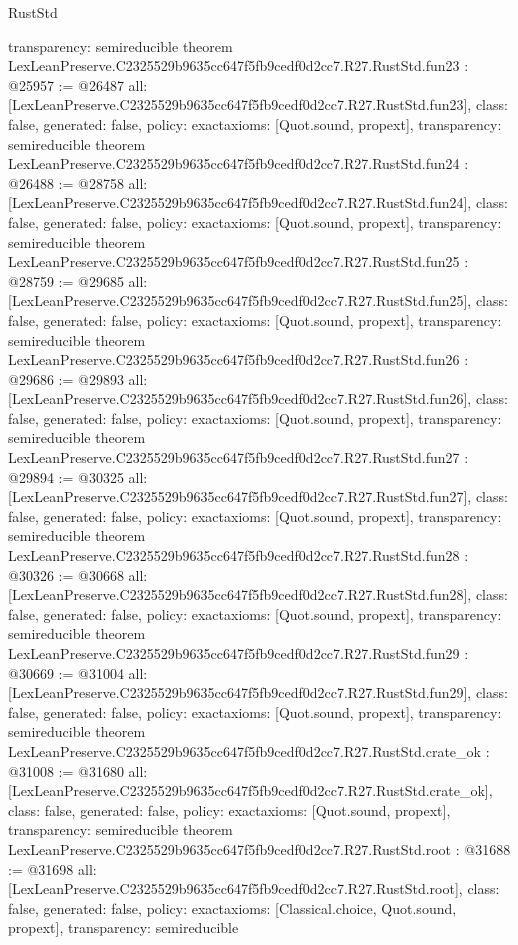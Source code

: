 \begin{lexlean}{RustStd}
\begin{coremodule}
{  transparency: semireducible
}
theorem LexLeanPreserve.C2325529b9635cc647f5fb9cedf0d2cc7.R27.RustStd.fun23 : @25957 := @26487 {
  all: [LexLeanPreserve.C2325529b9635cc647f5fb9cedf0d2cc7.R27.RustStd.fun23],
  class: false,
  generated: false,
  policy: exact{axioms: [Quot.sound, propext]},
  transparency: semireducible
}
theorem LexLeanPreserve.C2325529b9635cc647f5fb9cedf0d2cc7.R27.RustStd.fun24 : @26488 := @28758 {
  all: [LexLeanPreserve.C2325529b9635cc647f5fb9cedf0d2cc7.R27.RustStd.fun24],
  class: false,
  generated: false,
  policy: exact{axioms: [Quot.sound, propext]},
  transparency: semireducible
}
theorem LexLeanPreserve.C2325529b9635cc647f5fb9cedf0d2cc7.R27.RustStd.fun25 : @28759 := @29685 {
  all: [LexLeanPreserve.C2325529b9635cc647f5fb9cedf0d2cc7.R27.RustStd.fun25],
  class: false,
  generated: false,
  policy: exact{axioms: [Quot.sound, propext]},
  transparency: semireducible
}
theorem LexLeanPreserve.C2325529b9635cc647f5fb9cedf0d2cc7.R27.RustStd.fun26 : @29686 := @29893 {
  all: [LexLeanPreserve.C2325529b9635cc647f5fb9cedf0d2cc7.R27.RustStd.fun26],
  class: false,
  generated: false,
  policy: exact{axioms: [Quot.sound, propext]},
  transparency: semireducible
}
theorem LexLeanPreserve.C2325529b9635cc647f5fb9cedf0d2cc7.R27.RustStd.fun27 : @29894 := @30325 {
  all: [LexLeanPreserve.C2325529b9635cc647f5fb9cedf0d2cc7.R27.RustStd.fun27],
  class: false,
  generated: false,
  policy: exact{axioms: [Quot.sound, propext]},
  transparency: semireducible
}
theorem LexLeanPreserve.C2325529b9635cc647f5fb9cedf0d2cc7.R27.RustStd.fun28 : @30326 := @30668 {
  all: [LexLeanPreserve.C2325529b9635cc647f5fb9cedf0d2cc7.R27.RustStd.fun28],
  class: false,
  generated: false,
  policy: exact{axioms: [Quot.sound, propext]},
  transparency: semireducible
}
theorem LexLeanPreserve.C2325529b9635cc647f5fb9cedf0d2cc7.R27.RustStd.fun29 : @30669 := @31004 {
  all: [LexLeanPreserve.C2325529b9635cc647f5fb9cedf0d2cc7.R27.RustStd.fun29],
  class: false,
  generated: false,
  policy: exact{axioms: [Quot.sound, propext]},
  transparency: semireducible
}
theorem LexLeanPreserve.C2325529b9635cc647f5fb9cedf0d2cc7.R27.RustStd.crate_ok : @31008 := @31680 {
  all: [LexLeanPreserve.C2325529b9635cc647f5fb9cedf0d2cc7.R27.RustStd.crate_ok],
  class: false,
  generated: false,
  policy: exact{axioms: [Quot.sound, propext]},
  transparency: semireducible
}
theorem LexLeanPreserve.C2325529b9635cc647f5fb9cedf0d2cc7.R27.RustStd.root : @31688 := @31698 {
  all: [LexLeanPreserve.C2325529b9635cc647f5fb9cedf0d2cc7.R27.RustStd.root],
  class: false,
  generated: false,
  policy: exact{axioms: [Classical.choice, Quot.sound, propext]},
  transparency: semireducible
}


\end{coremodule}
\end{lexlean}
